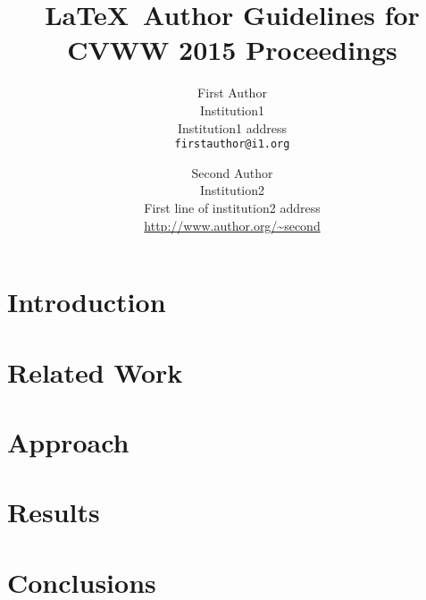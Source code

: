 \documentclass[11pt,twoside,twocolumn,a4paper]{article}
\begin{document}
\title{\LaTeX\ Author Guidelines for CVWW 2015 Proceedings}

\author{First Author\\
Institution1\\
Institution1 address\\
{\tt\small firstauthor@i1.org}
\and
Second Author\\
Institution2\\
First line of institution2 address\\
{\small\url{http://www.author.org/~second}}
}

\maketitle
\ifcvwwfinal\thispagestyle{fancy}\fi


\begin{abstract}

\end{abstract}


\section{Introduction}


\section{Related Work}
\label{sec:related_work}


\section{Approach}
\label{sec:approach}


\section{Results}
\label{sec:results}


\section{Conclusions}

\end{document}
